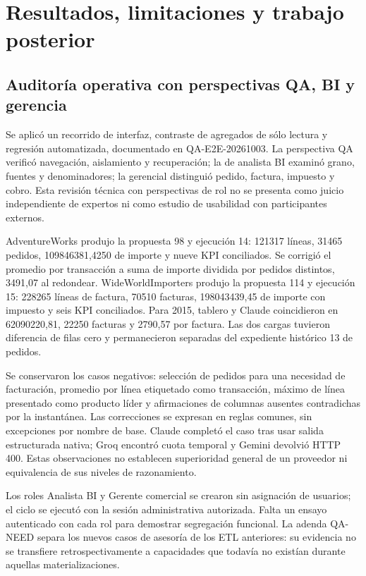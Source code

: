 \documentclass[11pt,letterpaper]{article}
\begin{document}
\section{Resultados, limitaciones y trabajo posterior}

\subsection{Auditoría operativa con perspectivas QA, BI y gerencia}

Se aplicó un recorrido de interfaz, contraste de agregados de sólo lectura y regresión
automatizada, documentado en QA-E2E-20261003. La perspectiva QA verificó navegación,
aislamiento y recuperación; la de analista BI examinó grano, fuentes y denominadores;
la gerencial distinguió pedido, factura, impuesto y cobro. Esta revisión técnica con
perspectivas de rol no se presenta como juicio independiente de expertos ni como
estudio de usabilidad con participantes externos.

AdventureWorks produjo la propuesta 98 y ejecución 14: 121317 líneas, 31465 pedidos,
109846381,4250 de importe y nueve KPI conciliados. Se corrigió el promedio por
transacción a suma de importe dividida por pedidos distintos, 3491,07 al redondear.
WideWorldImporters produjo la propuesta 114 y ejecución 15: 228265 líneas de factura,
70510 facturas, 198043439,45 de importe con impuesto y seis KPI conciliados. Para 2015,
tablero y Claude coincidieron en 62090220,81, 22250 facturas y 2790,57 por factura.
Las dos cargas tuvieron diferencia de filas cero y permanecieron separadas del
expediente histórico 13 de pedidos.

Se conservaron los casos negativos: selección de pedidos para una necesidad de
facturación, promedio por línea etiquetado como transacción, máximo de línea presentado
como producto líder y afirmaciones de columnas ausentes contradichas por la instantánea.
Las correcciones se expresan en reglas comunes, sin excepciones por nombre de base.
Claude completó el caso tras usar salida estructurada nativa; Groq encontró cuota
temporal y Gemini devolvió HTTP 400. Estas observaciones no establecen superioridad
general de un proveedor ni equivalencia de sus niveles de razonamiento.

Los roles Analista BI y Gerente comercial se crearon sin asignación de usuarios; el
ciclo se ejecutó con la sesión administrativa autorizada. Falta un ensayo autenticado
con cada rol para demostrar segregación funcional. La adenda QA-NEED separa los nuevos
casos de asesoría de los ETL anteriores: su evidencia no se transfiere retrospectivamente
a capacidades que todavía no existían durante aquellas materializaciones.
\end{document}
